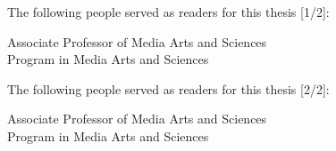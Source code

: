 %
%
%
%
% 

\begin{titlepage}
\begin{large}
The following people served as readers for this thesis [1/2]:

\signature{Sepandar Kamvar}{Associate Professor of Media Arts and Sciences \\
   Program in Media Arts and Sciences}

\end{large}
\end{titlepage}

\afterpage{\blankpage}
 
\begin{titlepage}
\begin{large}
The following people served as readers for this thesis [2/2]:

\signature{Iyad Rahwan}{Associate Professor of Media Arts and Sciences \\
   Program in Media Arts and Sciences}
 
\end{large}
\end{titlepage}

\afterpage{\blankpage}

